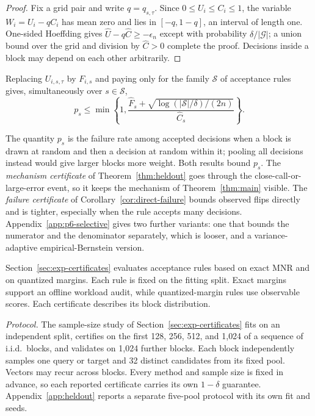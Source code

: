 \documentclass[twoside,11pt]{article}
\begin{document}
\begin{proof}
Fix a grid pair and write $q=q_{s,\tau}$. Since $0\le U_i\le C_i\le1$, the variable $W_i=U_i-qC_i$ has mean zero and lies in $[-q,1-q]$, an interval of length one. One-sided Hoeffding gives $\widehat U-q\widehat C\ge-\epsilon_n$ except with probability $\delta/|\mathcal G|$; a union bound over the grid and division by $\widehat C>0$ complete the proof. Decisions inside a block may depend on each other arbitrarily.
\end{proof}

\begin{corollary}
\label{cor:direct-failure}
Replacing $U_{i,s,\tau}$ by $F_{i,s}$ and paying only for the family $\mathcal S$ of acceptance rules gives, simultaneously over $s\in\mathcal S$,
\begin{equation}
p_s\le\min\!\left\{1,\frac{\widehat F_s+\sqrt{\log(|\mathcal S|/\delta)/(2n)}}{\widehat C_s}\right\}.
\end{equation}
\end{corollary}

The quantity $p_s$ is the failure rate among accepted decisions when a block is drawn at random and then a decision at random within it; pooling all decisions instead would give larger blocks more weight. Both results bound $p_s$. The \emph{mechanism certificate} of Theorem~\ref{thm:heldout} goes through the close-call-or-large-error event, so it keeps the mechanism of Theorem~\ref{thm:main} visible. The \emph{failure certificate} of Corollary~\ref{cor:direct-failure} bounds observed flips directly and is tighter, especially when the rule accepts many decisions. Appendix~\ref{app:p6-selective} gives two further variants: one that bounds the numerator and the denominator separately, which is looser, and a variance-adaptive empirical-Bernstein version.

Section~\ref{sec:exp-certificates} evaluates acceptance rules based on exact MNR and on quantized margins. Each rule is fixed on the fitting split. Exact margins support an offline workload audit, while quantized-margin rules use observable scores. Each certificate describes its block distribution.

\noindent\emph{Protocol.}\quad
The sample-size study of Section~\ref{sec:exp-certificates} fits on an independent split, certifies on the first 128, 256, 512, and 1{,}024 of a sequence of i.i.d.\ blocks, and validates on 1{,}024 further blocks. Each block independently samples one query or target and 32 distinct candidates from its fixed pool. Vectors may recur across blocks. Every method and sample size is fixed in advance, so each reported certificate carries its own $1-\delta$ guarantee. Appendix~\ref{app:heldout} reports a separate five-pool protocol with its own fit and seeds.
\end{document}
